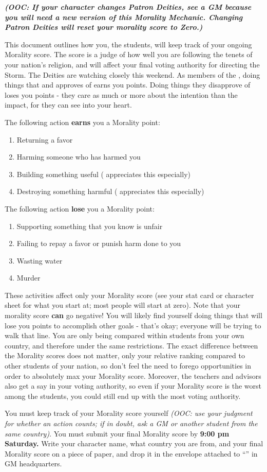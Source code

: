 \documentclass[green]{GL2020}
\begin{document}
\name{\gWRStudentMorality{}}
\emph{\textbf{(OOC: If your character changes Patron Deities, see a GM because you will need a new version of this Morality Mechanic. Changing Patron Deities will reset your morality score to Zero.)}}

This document outlines how you, the students, will keep track of your ongoing Morality score. The score is a judge of how well you are following the tenets of your nation’s religion, and will affect your final voting authority for directing the Storm. The Deities are watching closely this weekend. As members of the \pShip{}, doing things that \cEbbFull{\full} and \cFlowFull{\full} approves of earns you points. Doing things they disapprove of loses you points - they care as much or more about the intention than the impact, for they can see into your heart.

The following action \textbf{earns} you a Morality point:
\begin{enumerate}
  \item Returning a favor
  \item Harming someone who has harmed you
  \item Building something useful (\cFlow{} appreciates this especially)
  \item Destroying something harmful (\cEbb{} appreciates this especially)
\end{enumerate}

The following action \textbf{lose} you a Morality point:
\begin{enumerate}
  \item Supporting something that you know is unfair
  \item Failing to repay a favor or punish harm done to you
  \item Wasting water
  \item Murder
\end{enumerate}

These activities affect only your Morality score (see your stat card or character sheet for what you start at; most people will start at zero).  Note that your morality score \textbf{can} go negative! You will likely find yourself doing things that will lose you points to accomplish other goals - that’s okay; everyone will be trying to walk that line. You are only being compared within students from your own country, and therefore under the same restrictions. The exact difference between the Morality scores does not matter, only your relative ranking compared to other students of your nation, so don’t feel the need to forego opportunities in order to absolutely max your Morality score. Moreover, the teachers and advisors also get a say in your voting authority, so even if your Morality score is the worst among the students, you could still end up with the most voting authority. 

You must keep track of your Morality score yourself \emph{(OOC: use your judgment for whether an action counts; if in doubt, ask a GM or another student from the same country)}. You must submit your final Morality score by \textbf{9:00 pm Saturday.} Write your character name, what country you are from, and your final Morality score on a piece of paper, and drop it in the envelope attached to “\sSignV{}” in GM headquarters. 
\end{document}
